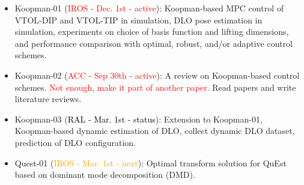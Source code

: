 \documentclass[11pt]{article}
\begin{document}
\begin{itemize}
  \item Koopman-01 (\textcolor{red}{IROS - Dec. 1st - active}):
  Koopman-based MPC control of VTOL-DIP and VTOL-TIP in simulation,
  DLO pose estimation in simulation,
  experiments on choice of basis function and lifting dimensions,
  and performance comparison with optimal, robust, and/or
  adaptive control schemes.\
  \item Koopman-02 (\textcolor{red}{ACC - Sep 30th - active}):
  A review on Koopman-based control schemes. \textcolor{red}{Not enough, make
  it part of another paper.} Read papers and write literature reviews.\

  \item Koopman-03 (\textcolor{black}{RAL - Mar. 1st - status}):
  Extension to Koopman-01, Koopman-based dynamic estimation of DLO,
  collect dynamic DLO dataset,
  prediction of DLO configuration.

  \item Quest-01 (\textcolor{orange}{IROS - Mar. 1st - next}):
  Optimal transform solution for QuEst based on dominant mode decomposition (DMD).

\end{itemize}
\end{document}
